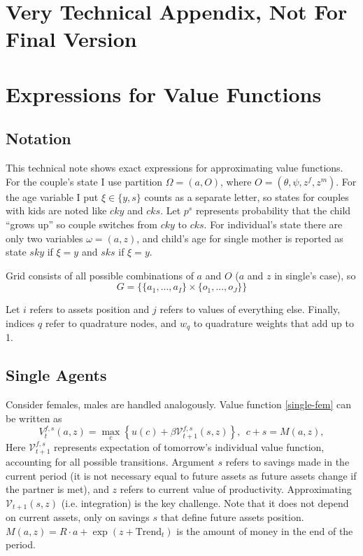 \newpage
\section*{Very Technical Appendix, Not For Final Version}


\section{Expressions for Value Functions}
\subsection{Notation}
This technical note shows exact expressions for approximating value functions. For the couple's state I use partition $\Omega = (a,O)$, where $O = (\theta,\psi,z^f,z^m)$. For the age variable I put $\xi\in\{y,s\}$ counts as a separate letter, so states for couples with kids are noted like $cky$ and $cks$. Let $p^s$ represents probability that the child ``grows up'' so couple switches from $cky$ to $cks$. For individual's state there are only two variables $\omega = (a,z)$, and child's age for single mother is reported as state $sky$ if $\xi = y$ and $sks$ if $\xi = y$. 

Grid consists of all possible combinations of $a$ and $O$ ($a$ and $z$ in single's case), so \[G = \{ \{a_1,...,a_I\} \times \{o_1,...,o_J\}\}\]

Let $i$ refers to assets position and $j$ refers to values of everything else. Finally, indices $q$ refer to quadrature nodes, and $w_q$ to quadrature weights that add up to 1.

\subsection{Single Agents}
Consider females, males are handled analogously. Value function \ref{single-fem} can be written as
\[V^{f,s}_t(a,z) = \max\limits_{c} \left\{ u(c) + \beta \mathcal{V}^{f,s}_{t+1}(s,z)\right\}, \ \ c + s = M(a,z),\]
Here  $\mathcal{V}^{f,s}_{t+1}$ represents expectation of tomorrow's individual value function, accounting for all possible transitions. Argument $s$ refers to savings made in the current period (it is not necessary equal to future assets as future assets change if the partner is met), and $z$ refers to current value of productivity. Approximating $\mathcal{V}_{t+1}(s,z)$ (i.e. integration) is the key challenge. Note that it does not depend on current assets, only on savings $s$ that define future assets position. $M(a,z) = R\cdot a + \exp(z + \text{Trend}_t)$ is the amount of money in the end of the period.

